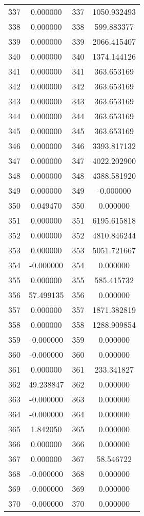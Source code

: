 \documentclass[12pt]{article}
\begin{document}
\begin{longtable}{@{}cccc@{}}
337 & 0.000000 & 337 & 1050.932493 \\
338 & 0.000000 & 338 & 599.883377 \\
339 & 0.000000 & 339 & 2066.415407 \\
340 & 0.000000 & 340 & 1374.144126 \\
341 & 0.000000 & 341 & 363.653169 \\
342 & 0.000000 & 342 & 363.653169 \\
343 & 0.000000 & 343 & 363.653169 \\
344 & 0.000000 & 344 & 363.653169 \\
345 & 0.000000 & 345 & 363.653169 \\
346 & 0.000000 & 346 & 3393.817132 \\
347 & 0.000000 & 347 & 4022.202900 \\
348 & 0.000000 & 348 & 4388.581920 \\
349 & 0.000000 & 349 & -0.000000 \\
350 & 0.049470 & 350 & 0.000000 \\
351 & 0.000000 & 351 & 6195.615818 \\
352 & 0.000000 & 352 & 4810.846244 \\
353 & 0.000000 & 353 & 5051.721667 \\
354 & -0.000000 & 354 & 0.000000 \\
355 & 0.000000 & 355 & 585.415732 \\
356 & 57.499135 & 356 & 0.000000 \\
357 & 0.000000 & 357 & 1871.382819 \\
358 & 0.000000 & 358 & 1288.909854 \\
359 & -0.000000 & 359 & 0.000000 \\
360 & -0.000000 & 360 & 0.000000 \\
361 & 0.000000 & 361 & 233.341827 \\
362 & 49.238847 & 362 & 0.000000 \\
363 & -0.000000 & 363 & 0.000000 \\
364 & -0.000000 & 364 & 0.000000 \\
365 & 1.842050 & 365 & 0.000000 \\
366 & 0.000000 & 366 & 0.000000 \\
367 & 0.000000 & 367 & 58.546722 \\
368 & -0.000000 & 368 & 0.000000 \\
369 & -0.000000 & 369 & 0.000000 \\
370 & -0.000000 & 370 & 0.000000 \\

\end{longtable}
\end{document}
